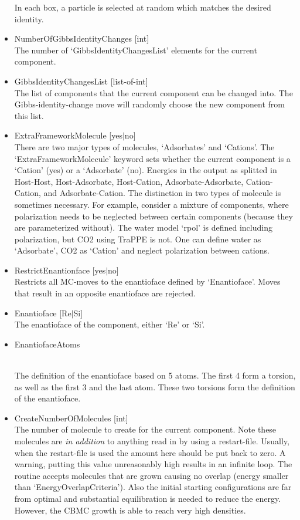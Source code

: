 \begin{itemize}
In each box, a particle is selected at random which matches the desired identity.
\item{NumberOfGibbsIdentityChanges [int]}\\
The number of `GibbsIdentityChangesList' elements for the current component.
\item{GibbsIdentityChangesList [list-of-int]}\\
The list of components that the current component can be changed into. The Gibbs-identity-change move will randomly choose the new component from this list.
\item{ExtraFrameworkMolecule [yes$|$no]}\\
There are two major types of molecules, `Adsorbates' and `Cations'. The `ExtraFrameworkMolecule' keyword sets whether the current component is a `Cation' (yes) or a `Adsorbate' (no).
Energies in the output as splitted in Host-Host, Host-Adsorbate, Host-Cation, Adsorbate-Adsorbate, Cation-Cation, and Adsorbate-Cation. The distinction in two types of molecule
is sometimes necessary. For example, consider a mixture of components, where polarization needs to be neglected between certain components (because they are parameterized without).
The water model `rpol' is defined including polarization, but CO2 using TraPPE is not. One can define water as `Adsorbate', CO2 as `Cation' and neglect polarization between cations.
\item{RestrictEnantionface [yes$|$no]}\\
Restricts all MC-moves to the enantioface defined by `Enantioface'. Moves that result in an opposite enantioface are rejected.
\item{Enantioface [Re$|$Si]}\\
The enantioface of the component, either `Re' or `Si'.
\item{EnantiofaceAtoms \begin{footnotesize}[F$|$A$|$C] [int] [int] [F$|$A$|$C] [int] [int] [F$|$A$|$C] [int] [int]
 [F$|$A$|$C] [int] [int] [F$|$A$|$C] [int] [int]\end{footnotesize}}\\
The definition of the enantioface based on 5 atoms. The first 4 form a torsion, as well as the first 3 and the last atom. These two torsions form the definition
of the enantioface.
\item{CreateNumberOfMolecules [int]}\\
The number of molecule to create for the current component. Note these molecules are \emph{in addition} to anything read in by using a restart-file. Usually, when the restart-file
is used the amount here should be put back to zero. A warning, putting this value unreasonably high results in an infinite loop. The routine accepts molecules that are grown causing
no overlap (energy smaller than `EnergyOverlapCriteria'). Also the initial starting configurations are far from optimal and substantial equilibration is needed to reduce the energy.
However, the CBMC growth is able to reach very high densities.
\end{itemize}


